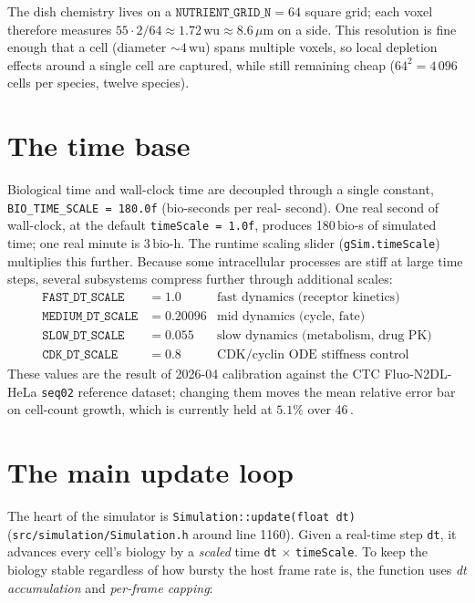 \documentclass[11pt,letterpaper,twoside,openany]{book}
\newcommand{\code}[1]{\texttt{#1}}
\newcommand{\file}[1]{\texttt{\small#1}}
\newcommand{\bioh}{\text{bio-h}}
\newcommand{\wu}{\text{wu}}
\newcommand{\um}{\ensuremath{\mu\text{m}}}
\begin{document}
The dish chemistry lives on a
$\code{NUTRIENT\_GRID\_N} = 64$ square grid; each voxel therefore
measures $55 \cdot 2 / 64 \approx 1.72\,\wu \approx 8.6\,\um$ on a
side. This resolution is fine enough that a cell (diameter
$\sim 4\,\wu$) spans multiple voxels, so local depletion effects
around a single cell are captured, while still remaining cheap
($64^2 = 4\,096$ cells per species, twelve species).

\section{The time base}
\label{sec:time}

Biological time and wall-clock time are decoupled through a single
constant, \code{BIO\_TIME\_SCALE = 180.0f} (bio-seconds per real-
second). One real second of wall-clock, at the default
\code{timeScale = 1.0f}, produces 180\,bio-s of simulated time;
one real minute is $3\,\bioh$. The runtime scaling slider
(\code{gSim.timeScale}) multiplies this further. Because some
intracellular processes are stiff at large time steps, several
subsystems compress further through additional scales:
\begin{align*}
  \code{FAST\_DT\_SCALE}   &= 1.0         & \text{fast dynamics (receptor kinetics)} \\
  \code{MEDIUM\_DT\_SCALE} &= 0.20096     & \text{mid dynamics (cycle, fate)}        \\
  \code{SLOW\_DT\_SCALE}   &= 0.055       & \text{slow dynamics (metabolism, drug PK)} \\
  \code{CDK\_DT\_SCALE}    &= 0.8         & \text{CDK/cyclin ODE stiffness control}
\end{align*}
These values are the result of 2026-04 calibration against the
CTC Fluo-N2DL-HeLa \texttt{seq02} reference dataset; changing them
moves the mean relative error bar on cell-count growth, which is
currently held at $5.1\%$ over 46\,\bioh.

\section{The main update loop}
\label{sec:mainloop}

The heart of the simulator is \code{Simulation::update(float dt)}
(\file{src/simulation/Simulation.h} around line 1160). Given a
real-time step \code{dt}, it advances every cell's biology by a
\emph{scaled} time \code{dt} $\times$ \code{timeScale}. To keep the
biology stable regardless of how bursty the host frame rate is, the
function uses \emph{dt accumulation} and \emph{per-frame capping}:
\end{document}

